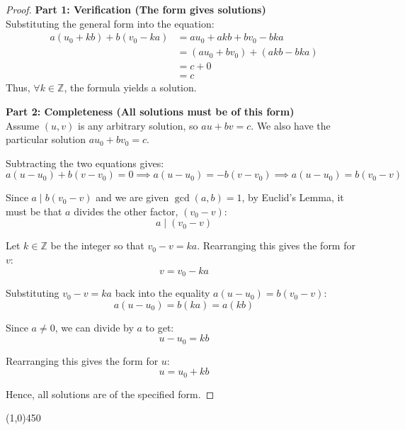 \begin{proof}
    \textbf{Part 1: Verification (The form gives solutions)} \\
    Substituting the general form into the equation:
    \begin{align*}
        a(u_0 + kb) + b(v_0 - ka) &= au_0 + akb + bv_0 - bka \\
        &= (au_0 + bv_0) + (akb - bka) \\
        &= c + 0 \\
        &= c
    \end{align*}
    Thus, $\forall k \in \mathbb{Z}$, the formula yields a solution.

    \textbf{Part 2: Completeness (All solutions must be of this form)} \\
    Assume $(u, v)$ is any arbitrary solution, so $au + bv = c$. We also have the particular solution $au_0 + bv_0 = c$.
    
    Subtracting the two equations gives:
    $$a(u - u_0) + b(v - v_0) = 0 \implies a(u - u_0) = -b(v - v_0) \implies a(u - u_0) = b(v_0 - v)$$
    
    Since $a \mid b(v_0 - v)$ and we are given $\gcd(a, b) = 1$, by Euclid's Lemma, it must be that $a$ divides the other factor, $(v_0 - v)$:
    $$a \mid (v_0 - v)$$
    
    Let $k \in \mathbb{Z}$ be the integer so that $v_0 - v = ka$. Rearranging this gives the form for $v$:
    $$v = v_0 - ka$$
    
    Substituting $v_0 - v = ka$ back into the equality $a(u - u_0) = b(v_0 - v)$:
    $$a(u - u_0) = b(ka) = a(kb)$$
    
    Since $a \ne 0$, we can divide by $a$ to get:
    $$u - u_0 = kb$$
    
    Rearranging this gives the form for $u$:
    $$u = u_0 + kb$$
    
    Hence, all solutions are of the specified form.
\end{proof}

\begin{center}
    \line(1,0){450}
\end{center}